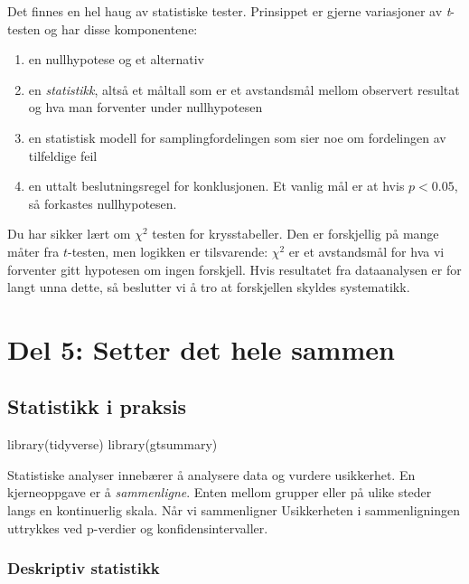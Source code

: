 \documentclass[
  letterpaper,
  DIV=11,
  numbers=noendperiod]{scrreprt}
\newenvironment{Shaded}{\begin{snugshade}}{\end{snugshade}}
\newcommand{\FunctionTok}[1]{\textcolor[rgb]{0.28,0.35,0.67}{#1}}
\newcommand{\NormalTok}[1]{\textcolor[rgb]{0.00,0.23,0.31}{#1}}
\providecommand{\tightlist}{%
  \setlength{\itemsep}{0pt}\setlength{\parskip}{0pt}}\usepackage{longtable,booktabs,array}
\theoremstyle{definition}
\theoremstyle{remark}
\begin{document}
Det finnes en hel haug av statistiske tester. Prinsippet er gjerne
variasjoner av \emph{t}-testen og har disse komponentene:

\begin{enumerate}
\def\labelenumi{\arabic{enumi}.}
\tightlist
\item
  en nullhypotese og et alternativ
\item
  en \emph{statistikk}, altså et måltall som er et avstandsmål mellom
  observert resultat og hva man forventer under nullhypotesen
\item
  en statistisk modell for samplingfordelingen som sier noe om
  fordelingen av tilfeldige feil
\item
  en uttalt beslutningsregel for konklusjonen. Et vanlig mål er at hvis
  \(p < 0.05\), så forkastes nullhypotesen.
\end{enumerate}

Du har sikker lært om \(\chi^2\) testen for krysstabeller. Den er
forskjellig på mange måter fra \(t\)-testen, men logikken er
tilsvarende: \(\chi^2\) er et avstandsmål for hva vi forventer gitt
hypotesen om ingen forskjell. Hvis resultatet fra dataanalysen er for
langt unna dette, så beslutter vi å tro at forskjellen skyldes
systematikk.

\part{Del 5: Setter det hele sammen}

\hypertarget{statistikk-i-praksis}{%
\chapter{Statistikk i praksis}\label{statistikk-i-praksis}}

\begin{Shaded}
\begin{Highlighting}[]
\FunctionTok{library}\NormalTok{(tidyverse)}
\FunctionTok{library}\NormalTok{(gtsummary)}
\end{Highlighting}
\end{Shaded}

Statistiske analyser innebærer å analysere data og vurdere usikkerhet.
En kjerneoppgave er å \emph{sammenligne}. Enten mellom grupper eller på
ulike steder langs en kontinuerlig skala. Når vi sammenligner
Usikkerheten i sammenligningen uttrykkes ved p-verdier og
konfidensintervaller.

\hypertarget{deskriptiv-statistikk}{%
\section{Deskriptiv statistikk}\label{deskriptiv-statistikk}}
\end{document}
